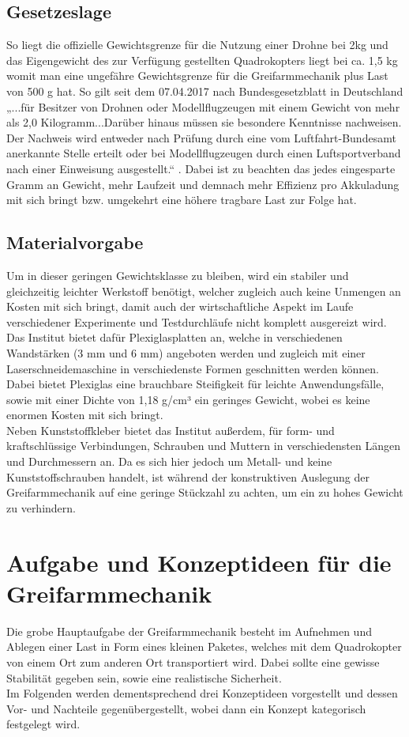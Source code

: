 \subsection{Gesetzeslage}
So liegt die offizielle Gewichtsgrenze für die Nutzung einer Drohne bei 2kg und das Eigengewicht des zur Verfügung gestellten Quadrokopters liegt bei ca. 1,5 kg womit man eine ungefähre Gewichtsgrenze für die Greifarmmechanik plus Last von 500 g hat. So gilt seit dem 07.04.2017 nach Bundesgesetzblatt in Deutschland „...für Besitzer von Drohnen oder Modellflugzeugen mit einem Gewicht von mehr als 2,0 Kilogramm...Darüber hinaus müssen sie besondere Kenntnisse nachweisen. Der Nachweis wird entweder nach Prüfung durch eine vom Luftfahrt-Bundesamt anerkannte Stelle erteilt oder bei Modellflugzeugen durch einen Luftsportverband nach einer Einweisung
ausgestellt.“ \cite{BMVI}. Dabei ist zu beachten das jedes eingesparte Gramm an Gewicht, mehr Laufzeit und demnach mehr Effizienz pro Akkuladung mit sich bringt bzw. umgekehrt eine höhere tragbare Last zur Folge hat.

\subsection{Materialvorgabe}
Um in dieser geringen Gewichtsklasse zu bleiben, wird ein stabiler und gleichzeitig leichter Werkstoff benötigt, welcher zugleich auch keine Unmengen an Kosten mit sich bringt, damit auch der wirtschaftliche Aspekt im Laufe verschiedener Experimente und Testdurchläufe nicht komplett ausgereizt wird. Das Institut bietet dafür Plexiglasplatten an, welche in verschiedenen Wandstärken (3 mm und 6 mm) angeboten werden und zugleich mit einer Laserschneidemaschine in verschiedenste Formen geschnitten werden können. Dabei bietet Plexiglas eine brauchbare Steifigkeit für leichte Anwendungsfälle, sowie mit einer Dichte von 1,18 g/cm³ \cite{Plexiglasdichte} ein geringes Gewicht, wobei es keine enormen Kosten mit sich bringt.
\\
Neben Kunststoffkleber bietet das Institut außerdem, für form- und kraftschlüssige Verbindungen, Schrauben und Muttern in verschiedensten Längen und Durchmessern an. Da es sich hier jedoch um Metall- und keine Kunststoffschrauben handelt, ist während der konstruktiven Auslegung der Greifarmmechanik auf eine geringe Stückzahl zu achten, um ein zu hohes Gewicht zu verhindern.

\section{Aufgabe und Konzeptideen für die Greifarmmechanik}
Die grobe Hauptaufgabe der Greifarmmechanik besteht im Aufnehmen und Ablegen einer Last in Form eines kleinen Paketes, welches mit dem Quadrokopter von einem Ort zum anderen Ort transportiert wird. Dabei sollte eine gewisse Stabilität gegeben sein, sowie eine realistische Sicherheit.
\\
Im Folgenden werden dementsprechend drei Konzeptideen vorgestellt und dessen Vor- und Nachteile gegenübergestellt, wobei dann ein Konzept kategorisch festgelegt wird.


